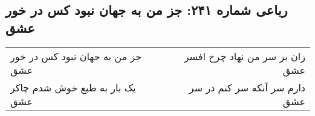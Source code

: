 \begin{center}
\section*{رباعی شماره ۲۴۱: جز من به جهان نبود کس در خور عشق}
\label{sec:sh241}
\begin{longtable}{l p{0.5cm} r}
جز من به جهان نبود کس در خور عشق
&&
زان بر سر من نهاد چرخ افسر عشق
\\
یک بار به طبع خوش شدم چاکر عشق
&&
دارم سر آنکه سر کنم در سر عشق
\\
\end{longtable}
\end{center}
